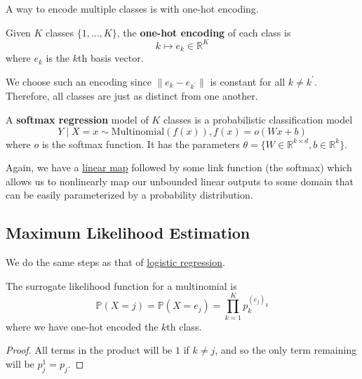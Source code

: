   A way to encode multiple classes is with one-hot encoding. 

  \begin{definition}
    \label{def:one-hot-encoding}
    Given $K$ classes $\{1, \ldots, K\}$, the \textbf{one-hot encoding} of each class is 
    \begin{equation}
      k \mapsto e_k \in \mathbb{R}^K
    \end{equation}
    where $e_k$ is the $k$th basis vector. 
  \end{definition} 

  We choose such an encoding since $\|e_k - e_{k^\prime}\|$ is constant for all $k \neq k^\prime$. Therefore, all classes are just as distinct from one another. 

  \begin{definition}
    \label{def:softmax-regression-model}
    A \textbf{softmax regression} model of $K$ classes is a probabilistic classification model 
    \begin{equation}
      Y \mid X = x \sim \mathrm{Multinomial}(f(x)), f(x) = o(Wx + b)
    \end{equation} 
    where $o$ is the softmax function. It has the parameters $\theta = \{W \in \mathbb{R}^{k \times d}, b \in \mathbb{R}^k\}$. 
  \end{definition}

  Again, we have a \hyperref[lin-def:linear_map]{linear map} followed by some link function (the softmax) which allows us to nonlinearly map our unbounded linear outputs to some domain that can be easily parameterized by a probability distribution. 

\subsection{Maximum Likelihood Estimation} 

  We do the same steps as that of \hyperref[def:logistic-regression]{logistic regression}. 

  \begin{lemma}
    \label{thm:likelihood-for-multinomial}
    The surrogate likelihood function for a multinomial is 
    \begin{equation}
      \mathbb{P}(X = j) = \mathbb{P}(X = e_j) = \prod_{k=1}^K p_k^{(e_j)_k} 
    \end{equation}
    where we have one-hot encoded the $k$th class. 
  \end{lemma} 
  \begin{proof}
    All terms in the product will be $1$ if $k \neq j$, and so the only term remaining will be $p_j^1 = p_j$. 
  \end{proof} 


